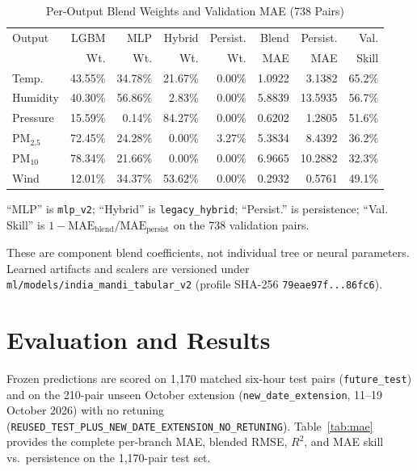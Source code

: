 \documentclass[journal,a4paper]{IEEEtran}
\begin{document}
\begin{table}[!htbp]
\caption{Per-Output Blend Weights and Validation MAE (738 Pairs)}
\label{tab:blend}
\centering
\footnotesize
\setlength{\tabcolsep}{2.8pt}
\begin{tabular}{@{}lrrrrrrr@{}}
\toprule
Output & LGBM & MLP & Hybrid & Persist. & Blend & Persist. & Val. \\
       & Wt. & Wt. & Wt. & Wt. & MAE & MAE & Skill \\
\midrule
Temp.      & 43.55\% & 34.78\% & 21.67\% & 0.00\% & 1.0922 & 3.1382 & 65.2\% \\
Humidity   & 40.30\% & 56.86\% &  2.83\% & 0.00\% & 5.8839 & 13.5935 & 56.7\% \\
Pressure   & 15.59\% &  0.14\% & 84.27\% & 0.00\% & 0.6202 & 1.2805 & 51.6\% \\
PM$_{2.5}$ & 72.45\% & 24.28\% &  0.00\% & 3.27\% & 5.3834 & 8.4392 & 36.2\% \\
PM$_{10}$  & 78.34\% & 21.66\% &  0.00\% & 0.00\% & 6.9665 & 10.2882 & 32.3\% \\
Wind       & 12.01\% & 34.37\% & 53.62\% & 0.00\% & 0.2932 & 0.5761 & 49.1\% \\
\bottomrule
\end{tabular}

\vspace{2pt}
\raggedright\scriptsize
``MLP'' is \texttt{mlp\_v2}; ``Hybrid'' is \texttt{legacy\_hybrid}; ``Persist.'' is persistence; ``Val. Skill'' is $1 - \text{MAE}_{\text{blend}}/\text{MAE}_{\text{persist}}$ on the 738 validation pairs.
\end{table}

These are component blend coefficients, not individual tree or neural parameters. Learned artifacts and scalers are versioned under \nolinkurl{ml/models/india_mandi_tabular_v2} (profile SHA-256 \texttt{79eae97f...86fc6}).

\section{Evaluation and Results}

Frozen predictions are scored on 1{,}170 matched six-hour test pairs (\texttt{future\_test}) and on the 210-pair unseen October extension (\texttt{new\_date\_extension}, 11--19 October 2026) with no retuning (\texttt{REUSED\_TEST\_PLUS\_NEW\_DATE\_EXTENSION\_NO\_RETUNING}). Table~\ref{tab:mae} provides the complete per-branch MAE, blended RMSE, $R^2$, and MAE skill vs.\ persistence on the 1{,}170-pair test set.
\end{document}
